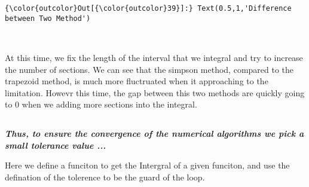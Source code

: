 \documentclass[11pt]{article}
\begin{document}
\begin{Verbatim}[commandchars=\\\{\}]
{\color{outcolor}Out[{\color{outcolor}39}]:} Text(0.5,1,'Difference between Two Method')
\end{Verbatim}
            
    \begin{center}
    \end{center}
    { \hspace*{\fill} \\}
    
    At this time, we fix the length of the interval that we integral and try
to increase the number of sections. We can see that the simpson method,
compared to the trapezoid method, is much more fluctruated when it
approaching to the limitation. Howevr this time, the gap between this
two methods are quickly going to 0 when we adding more sections into the
integral.

\subsection{}\label{section}

\textbf{\emph{Thus, to ensure the convergence of the numerical
algorithms we pick a small tolerance value ...}}

Here we define a funciton to get the Intergral of a given funciton, and
use the defination of the tolerence to be the guard of the loop.
\end{document}
